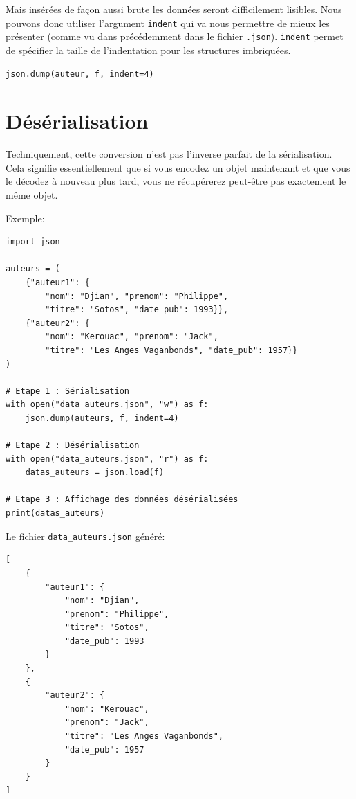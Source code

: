 \documentclass[a4paper,11pt]{book}
\begin{document}
Mais insérées de façon aussi brute les données seront difficilement lisibles. Nous pouvons donc utiliser l'argument \texttt{indent} qui va nous permettre de mieux les présenter (comme vu dans précédemment dans le fichier \texttt{.json}). \texttt{indent} permet de spécifier la taille de l'indentation pour les structures imbriquées.
\begin{lstlisting}[caption=Ecriture de données avec indentation]
	json.dump(auteur, f, indent=4)
\end{lstlisting}
\medskip

\section{Désérialisation}
Techniquement, cette conversion n'est pas l'inverse parfait de la sérialisation. Cela signifie essentiellement que si vous encodez un objet maintenant et que vous le décodez à nouveau plus tard, vous ne récupérerez peut-être pas exactement le même objet.
\medskip

Exemple:
\begin{lstlisting}[caption=Sérialisation et désérialisation]
import json

auteurs = (
    {"auteur1": {
        "nom": "Djian", "prenom": "Philippe",
        "titre": "Sotos", "date_pub": 1993}},
    {"auteur2": {
        "nom": "Kerouac", "prenom": "Jack",
        "titre": "Les Anges Vaganbonds", "date_pub": 1957}}
)

# Etape 1 : Sérialisation
with open("data_auteurs.json", "w") as f:
    json.dump(auteurs, f, indent=4)

# Etape 2 : Désérialisation
with open("data_auteurs.json", "r") as f:
    datas_auteurs = json.load(f)

# Etape 3 : Affichage des données désérialisées
print(datas_auteurs)
\end{lstlisting}\label{deserialisationJSON}
\medskip

Le fichier \texttt{data\_auteurs.json} généré:
\begin{lstlisting}[caption=Le fichier \texttt{.json} obtenu grâce à la sérialisation]
[
    {
        "auteur1": {
            "nom": "Djian",
            "prenom": "Philippe",
            "titre": "Sotos",
            "date_pub": 1993
        }
    },
    {
        "auteur2": {
            "nom": "Kerouac",
            "prenom": "Jack",
            "titre": "Les Anges Vaganbonds",
            "date_pub": 1957
        }
    }
]
\end{lstlisting}
\medskip
\end{document}

